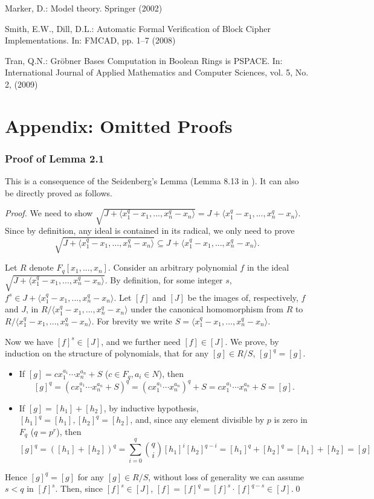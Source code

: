 \documentclass[envcountsect]{llncs}
\begin{document}
{{\begin{thebibliography}{20}
 Marker, D.: Model theory. Springer (2002)

 Smith, E.W., Dill, D.L.: Automatic Formal Verification of Block Cipher Implementations.
In: FMCAD, pp. 1--7 (2008)

 Tran, Q.N.: Gr\"obner Bases Computation in Boolean Rings is PSPACE. In: International Journal of Applied Mathematics and Computer Sciences, vol. 5, No. 2, (2009)

\end{thebibliography}

\newpage

\section*{Appendix: Omitted Proofs}

\subsubsection{Proof of Lemma 2.1}

This is a consequence of the Seidenberg's Lemma (Lemma 8.13 in \cite{grobnerbook}). It can also be directly proved as follows.
\begin{proof}
We need to show $\sqrt{J+ \langle x_1^q-x_1,...,x_n^q-x_n\rangle}= J+ \langle
x_1^q-x_1,...,x_n^q-x_n\rangle.$ Since by definition, any ideal is contained in its
radical, we only need to prove $$\sqrt{J+ \langle
x_1^q-x_1,...,x_n^q-x_n\rangle}\subseteq J+ \langle x_1^q-x_1,...,x_n^q-x_n\rangle.$$

Let $R$ denote $F_q[x_1,...,x_n]$. Consider an arbitrary polynomial $f$ in the ideal $\sqrt{J+ \langle
x_1^q-x_1,...,x_n^q-x_n\rangle}$. By definition, for some integer $s$, $f^s\in J+
\langle x_1^q-x_1,...,x_n^q-x_n\rangle$. Let $[f]$ and $[J]$ be the images of,
respectively, $f$ and $J$, in $R/\langle x_1^q-x_1,...,x_n^q-x_n\rangle$ under the
canonical homomorphism from $R$ to $R/\langle x_1^q-x_1,...,x_n^q-x_n\rangle.$ For brevity we write $S=\langle x_1^q-x_1,...,x_n^q-x_n\rangle$.

Now we have $[f]^s\in [J]$, and we further need $[f]\in [J]$. We prove, by induction on the structure of polynomials, that for any $[g]\in R/S$, $[g]^q=[g]$.  
\begin{itemize}
\item If $[g]=c x_1^{a_1}\cdots x_n^{a_n}+S$ ($c\in F_q, a_i\in N$), then
$$[g]^q=(cx_1^{a_1}\cdots x_n^{a_n}+S)^q=(cx_1^{a_1}\cdots
x_n^{a_n})^q+S=cx_1^{a_1}\cdots x_n^{a_n}+S=[g].$$
\item If $[g]=[h_1]+[h_2]$, by inductive hypothesis, $[h_1]^q=[h_1], [h_2]^q=[h_2]$, and,
since any element divisible by $p$ is zero in $F_q$ ($q=p^r$), then
$$[g]^q=([h_1]+[h_2])^q=\sum_{i=0}^{q}{q\choose
i}[h_1]^i[h_2]^{q-i}=[h_1]^q+[h_2]^q=[h_1]+[h_2]=[g]$$
\end{itemize}
Hence $[g]^q=[g]$ for any $[g]\in R/S$, without loss of generality
we can assume $s<q$ in $[f]^s$. Then, since $[f]^s\in [J]$, $
[f]=[f]^q=[f]^s\cdot[f]^{q-s}\in [J].$\qed
\end{proof}




}}
\end{document}
